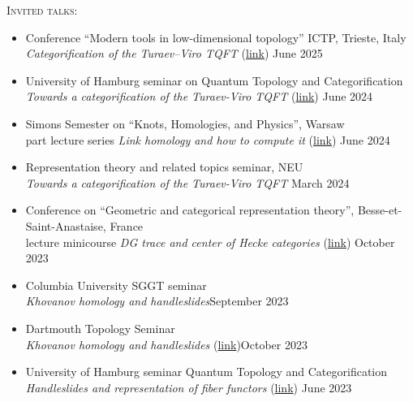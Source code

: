 \documentclass[12pt]{amsart}
\renewcommand{\j}{\indent}
\newcommand{\newitem}[1]{\noindent\textsc{#1:}\vskip5pt  }
\newcommand{\conf}{}%
\begin{document}
\newitem{Invited talks}
\begin{itemize}\setlength{\itemsep}{5pt}
\item[$\cdot$] Conference ``Modern tools in low-dimensional topology'' ICTP, Trieste, Italy\\
\j\emph{Categorification of the Turaev--Viro TQFT} (\href{https://indico.ictp.it/event/10839/session/7/contribution/37}{link}) \hfill June 2025

\item[$\cdot$] University of Hamburg seminar on Quantum Topology and Categorification\\ \j\emph{Towards a categorification of the Turaev-Viro TQFT} (\href{https://www.math.uni-hamburg.de/home/wedrich/ResSemArchive.html}{link}) \hfill June 2024

\item[$\cdot$] Simons Semester on ``Knots, Homologies, and Physics'', Warsaw\\ \j 4 part lecture series \emph{Link homology and how to compute it} (\href{https://simons2024.fuw.edu.pl/}{link}) \hfill June 2024

\item[$\cdot$]  Representation theory and related topics seminar, NEU\\
\j \emph{Towards a categorification of the Turaev-Viro TQFT} \hfill March 2024

\item[$\cdot$] Conference on ``Geometric and categorical representation theory'', Besse-et-Saint-Anastaise, France\\
\j 4 lecture minicourse \emph{DG trace and center of Hecke categories} (\href{https://indico.math.cnrs.fr/event/9436/}{link}) \hfill October 2023

\item[$\cdot$] Columbia University SGGT seminar\\ \j\emph{Khovanov homology and handleslides}\hfill September 2023

\item[$\cdot$] Dartmouth Topology Seminar \\
\j\emph{Khovanov homology and handleslides} (\href{https://math.dartmouth.edu/~topology/2023-2024.html}{link})\hfill October 2023

\item[$\cdot$] University of Hamburg seminar Quantum Topology and Categorification
\\ \j\emph{Handleslides and representation of fiber functors} (\href{https://www.math.uni-hamburg.de/home/wedrich/ResSemArchive.html}{link}) \hfill June 2023


\end{itemize}
\end{document}
